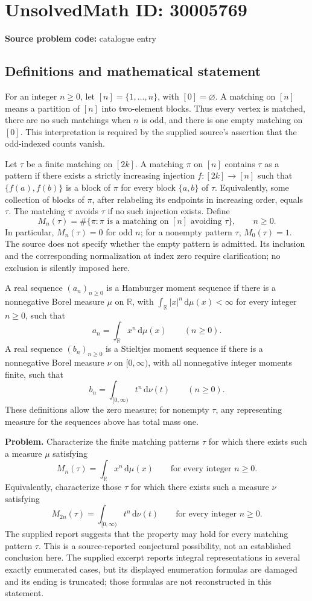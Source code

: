 \documentclass[11pt]{article}
\newcommand{\R}{\mathbb{R}}
\begin{document}
\section*{UnsolvedMath ID: 30005769}
\textbf{Source problem code:} catalogue entry
\subsection{Definitions and mathematical statement}
For an integer \(n\geq 0\), let \([n]=\{1,\ldots,n\}\), with \([0]=\varnothing\). A matching on \([n]\) means a partition of \([n]\) into two-element blocks. Thus every vertex is matched, there are no such matchings when \(n\) is odd, and there is one empty matching on \([0]\). This interpretation is required by the supplied source's assertion that the odd-indexed counts vanish.

Let \(\tau\) be a finite matching on \([2k]\). A matching \(\pi\) on \([n]\) contains \(\tau\) as a pattern if there exists a strictly increasing injection \(f:[2k]\to[n]\) such that \(\{f(a),f(b)\}\) is a block of \(\pi\) for every block \(\{a,b\}\) of \(\tau\). Equivalently, some collection of blocks of \(\pi\), after relabeling its endpoints in increasing order, equals \(\tau\). The matching \(\pi\) avoids \(\tau\) if no such injection exists. Define
\[
M_n(\tau)=\#\{\pi:\pi\text{ is a matching on }[n]\text{ avoiding }\tau\},\qquad n\geq0.
\]
In particular, \(M_n(\tau)=0\) for odd \(n\); for a nonempty pattern \(\tau\), \(M_0(\tau)=1\). The source does not specify whether the empty pattern is admitted. Its inclusion and the corresponding normalization at index zero require clarification; no exclusion is silently imposed here.

A real sequence \((a_n)_{n\geq0}\) is a Hamburger moment sequence if there is a nonnegative Borel measure \(\mu\) on \(\R\), with \(\int_{\R}|x|^n\,\mathrm d\mu(x)<\infty\) for every integer \(n\geq0\), such that
\[
a_n=\int_{\R}x^n\,\mathrm d\mu(x)\qquad(n\geq0).
\]
A real sequence \((b_n)_{n\geq0}\) is a Stieltjes moment sequence if there is a nonnegative Borel measure \(\nu\) on \([0,\infty)\), with all nonnegative integer moments finite, such that
\[
b_n=\int_{[0,\infty)}t^n\,\mathrm d\nu(t)\qquad(n\geq0).
\]
These definitions allow the zero measure; for nonempty \(\tau\), any representing measure for the sequences above has total mass one.

\textbf{Problem.} Characterize the finite matching patterns \(\tau\) for which there exists such a measure \(\mu\) satisfying
\[
M_n(\tau)=\int_{\R}x^n\,\mathrm d\mu(x)\qquad\text{for every integer }n\geq0.
\]
Equivalently, characterize those \(\tau\) for which there exists such a measure \(\nu\) satisfying
\[
M_{2n}(\tau)=\int_{[0,\infty)}t^n\,\mathrm d\nu(t)\qquad\text{for every integer }n\geq0.
\]
The supplied report suggests that the property may hold for every matching pattern \(\tau\). This is a source-reported conjectural possibility, not an established conclusion here. The supplied excerpt reports integral representations in several exactly enumerated cases, but its displayed enumeration formulas are damaged and its ending is truncated; those formulas are not reconstructed in this statement.
\end{document}
